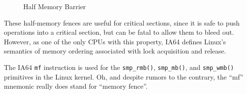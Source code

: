 \begin{figure}[tb]
\begin{center}
\end{center}
\caption{Half Memory Barrier}
\end{figure}

These half-memory fences are useful for critical sections, since
it is safe to push operations into a critical section, but can be
fatal to allow them to bleed out.
However, as one of the only CPUs with this property, IA64 defines
Linux's semantics of memory ordering associated with lock acquisition
and release.

The IA64 {\tt mf} instruction is used for the {\tt smp\_rmb()},
{\tt smp\_mb()}, and {\tt smp\_wmb()} primitives in the Linux kernel.
Oh, and despite rumors to the contrary, the ``mf'' mnemonic really
does stand for ``memory fence''.

